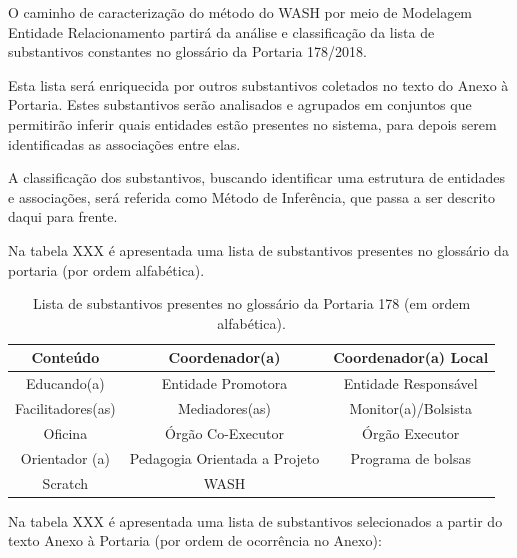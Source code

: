 \documentclass[
12pt,		%
openright,	%
twoside,  %
a4paper,			%
chapter=TITLE,		%
english,			%
french,				%
spanish,			%
brazil				%
]{USPSC-classe/USPSC}
\begin{document}
O caminho de caracteriza\c{c}\~ao do m\'etodo do WASH por meio de Modelagem Entidade Relacionamento partir\'a da an\'alise e classifica\c{c}\~ao da lista de substantivos constantes no gloss\'ario da Portaria 178/2018.




Esta lista ser\'a enriquecida por outros substantivos coletados no texto do Anexo \`a Portaria. Estes substantivos ser\~ao analisados e agrupados em conjuntos que permitir\~ao inferir quais entidades est\~ao presentes no sistema, para depois serem identificadas as associa\c{c}\~oes entre elas.




A classifica\c{c}\~ao dos substantivos, buscando identificar uma estrutura de entidades e associa\c{c}\~oes, ser\'a referida como \textquotedbl M\'etodo de Infer\^encia\textquotedbl , que passa a ser descrito daqui para frente.




Na tabela XXX \'e apresentada uma lista de substantivos presentes no gloss\'ario da portaria (por ordem alfab\'etica).








\begin{table}[htb]
\tiny
\caption{\label{443c6ee28b2545c8669e0d3532f6995e639d3416}Lista de substantivos presentes no gloss\'ario da Portaria 178 (em ordem alfab\'etica).}

\centering
\begin{tabular}{|c|c|c|}
\hline
Conte\'udo  &  Coordenador(a)  &  Coordenador(a) Local \\
\hline
Educando(a)  &  Entidade Promotora  &  Entidade Respons\'avel \\
\hline
Facilitadores(as)  &  Mediadores(as)  &  Monitor(a)/Bolsista \\
\hline
Oficina  &  \'Org\~ao Co-Executor  &  \'Org\~ao Executor \\
\hline
Orientador (a)  &  Pedagogia Orientada a Projeto  & Programa de bolsas \\
\hline
Scratch  &  WASH  &  \\
\hline
\end{tabular}
\end{table}


Na tabela XXX \'e apresentada uma lista de substantivos selecionados a partir do texto Anexo \`a Portaria (por ordem de ocorr\^encia no Anexo):
\end{document}
